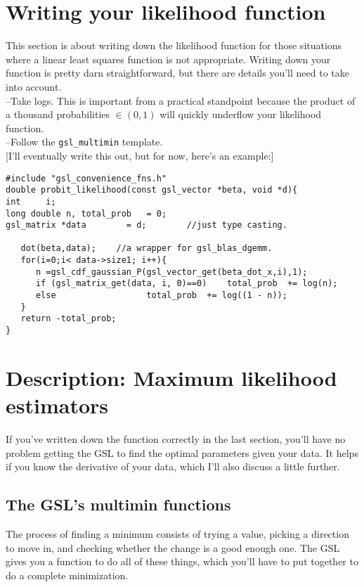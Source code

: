 \section{Writing your likelihood function} 
This section is about writing down the likelihood function for those situations where a linear least
squares function is not appropriate.
Writing down your function
is pretty darn straightforward, but there are details you'll need to take into account.\\
--Take logs. This is important from a practical standpoint because the product of a thousand probabilities
$\in (0,1)$ will quickly underflow your likelihood function. \\
--Follow the {\tt gsl\_multimin} template.\\

[I'll eventually write this out, but for now, here's an example:]


\begin{verbatim}
#include "gsl_convenience_fns.h"
double probit_likelihood(const gsl_vector *beta, void *d){
int		i;
long double	n, total_prob	= 0;
gsl_matrix *data 		= d;		//just type casting.

   dot(beta,data);    //a wrapper for gsl_blas_dgemm.
   for(i=0;i< data->size1; i++){
      n	=gsl_cdf_gaussian_P(gsl_vector_get(beta_dot_x,i),1);
      if (gsl_matrix_get(data, i, 0)==0) 	total_prob	+= log(n);
      else 					total_prob	+= log((1 - n));
   }
   return -total_prob;
}
\end{verbatim}

\section{Description: Maximum likelihood estimators} 
If you've written
down the function correctly in the last section, you'll have no problem
getting the GSL to find the optimal parameters given your data.  It helps
if you know the derivative of your data, which I'll also discuss a little
further.

\subsection{The GSL's multimin functions} The process of finding a minimum consists of trying a
value, picking a direction to move in, and checking whether the change is a good enough one. The GSL
gives you a function to do all of these things, which you'll have to put together to do a complete
minimization.

